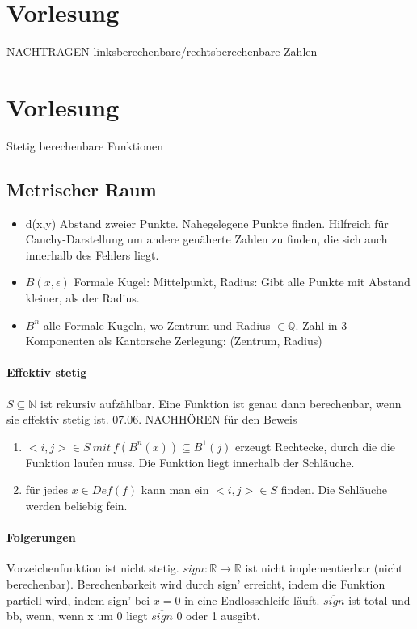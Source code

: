 \documentclass[ngerman]{scrartcl}
\begin{document}
\section{Vorlesung}
NACHTRAGEN
linksberechenbare/rechtsberechenbare Zahlen

\section{Vorlesung}
Stetig berechenbare Funktionen
\subsection{Metrischer Raum}
\begin{itemize}
  \item d(x,y) Abstand zweier Punkte. Nahegelegene Punkte finden. Hilfreich für Cauchy-Darstellung um andere genäherte Zahlen zu finden, die sich auch innerhalb des Fehlers liegt.
  \item $ B(x,\epsilon) $ Formale Kugel: Mittelpunkt, Radius: Gibt alle Punkte mit Abstand kleiner, als der Radius.
  \item $ B^n $ alle Formale Kugeln, wo Zentrum und Radius $ \in\mathbb{Q} $. Zahl in 3 Komponenten als Kantorsche Zerlegung: (Zentrum, Radius)
\end{itemize}

\paragraph{Effektiv stetig}
$ S \subseteq \mathbb{N} $ ist rekursiv aufzählbar. Eine Funktion ist genau dann berechenbar, wenn sie effektiv stetig ist. 07.06. NACHHÖREN für den Beweis
\begin{enumerate}
  \item $ <i,j> \in S\ mit\ f(B^n(x))\subseteq B^1(j) $ erzeugt Rechtecke, durch die die Funktion laufen muss. Die Funktion liegt innerhalb der Schläuche.
  \item für jedes $ x\in Def(f) $ kann man ein $ <i,j> \in S $ finden. Die Schläuche werden beliebig fein.
\end{enumerate}

\paragraph{Folgerungen} Vorzeichenfunktion ist nicht stetig. $ sign: \mathbb{R} \rightarrow \mathbb{R}  $ ist nicht implementierbar (nicht berechenbar). Berechenbarkeit wird durch sign' erreicht, indem die Funktion partiell wird, indem sign' bei $ x=0 $ in eine Endlosschleife läuft. $ \overline{sign} $ ist total und bb, wenn, wenn x um 0 liegt $ \overline{sign} $ 0 oder 1 ausgibt.
\end{document}
